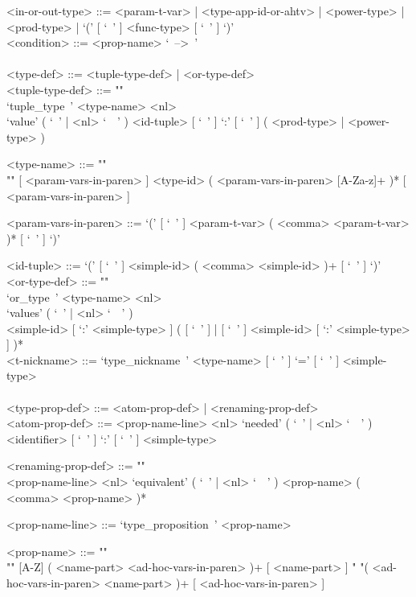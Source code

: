 \documentclass{article}
\begin{document}
\begin{grammar}
<in-or-out-type> ::=
<param-t-var> | <type-app-id-or-ahtv> | <power-type> | <prod-type> |
`(' [ `\ ' ] <func-type>  [ `\ ' ] `)'
\\

<condition> ::= <prop-name> `\ -->\ '
\\
\\

\newpage
<type-def> ::= <tuple-type-def> | <or-type-def>
\\

<tuple-type-def> ::= ""\\
`tuple_type\ ' <type-name> <nl> \\
`value' ( `\ ' | <nl> `\ \ ' )
<id-tuple> [ `\ ' ] `:' [ `\ ' ] ( <prod-type> | <power-type> )

<type-name> ::= ""\\""
[ <param-vars-in-paren> ] <type-id> ( <param-vars-in-paren> [A-Za-z]+ )*
[ <param-vars-in-paren> ]

<param-vars-in-paren> ::=
`(' [ `\ ' ] <param-t-var> ( <comma> <param-t-var> )* [ `\ ' ] `)'

<id-tuple> ::= `(' [ `\ ' ] <simple-id> ( <comma> <simple-id> )+ [ `\ ' ] `)'
\\

<or-type-def> ::= ""\\
`or_type\ ' <type-name> <nl> \\
`values' ( `\ ' | <nl> `\ \ ' ) \\
<simple-id> [ `:' <simple-type> ]
( [ `\ ' ] | [ `\ ' ] <simple-id> [ `:' <simple-type> ] )*
\\

<t-nickname> ::=
`type_nickname\ ' <type-name> [ `\ ' ] `=' [ `\ ' ] <simple-type>
\\\\

<type-prop-def> ::= <atom-prop-def> | <renaming-prop-def>
\\

<atom-prop-def> ::=
<prop-name-line> <nl> `needed' ( `\ ' | <nl> `\ \ ' )
<identifier> [ `\ ' ] `:' [ `\ ' ] <simple-type>

<renaming-prop-def> ::= ""\\
<prop-name-line> <nl>
`equivalent' ( `\ ' | <nl> `\ \ ' ) <prop-name> ( <comma> <prop-name> )*

<prop-name-line> ::= `type_proposition\ ' <prop-name>

<prop-name> ::=  ""\\""
[A-Z] ( <name-part> <ad-hoc-vars-in-paren> )+ [ <name-part> ]
\alt " "( <ad-hoc-vars-in-paren> <name-part> )+ [ <ad-hoc-vars-in-paren> ]


\end{grammar}
\end{document}
